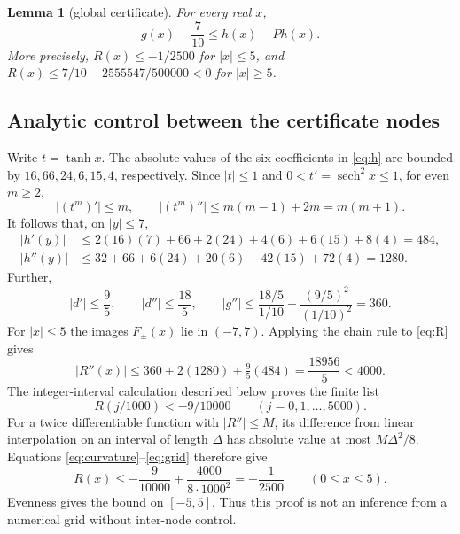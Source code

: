 \documentclass[11pt]{article}
\newtheorem{lemma}[theorem]{Lemma}
\theoremstyle{remark}
\newcommand{\sech}{\operatorname{sech}}
\begin{document}
\begin{lemma}[global certificate]\label{lem:drift}
For every real $x$,
\begin{equation}\label{eq:drift}
g(x)+\frac7{10}\le h(x)-Ph(x).
\end{equation}
More precisely, $R(x)\le-1/2500$ for $|x|\le5$, and
$R(x)\le7/10-2555547/500000<0$ for $|x|\ge5$.
\end{lemma}

\subsection{Analytic control between the certificate nodes}
Write $t=\tanh x$. The absolute values of the six coefficients in \eqref{eq:h} are bounded by $16,66,24,6,15,4$, respectively. Since $|t|\le1$ and $0<t'=\sech^2 x\le1$, for even $m\ge2$,
\[
|(t^m)'|\le m,\qquad
|(t^m)''|\le m(m-1)+2m=m(m+1).
\]
It follows that, on $|y|\le7$,
\begin{align*}
|h'(y)|&\le 2(16)(7)+66+2(24)+4(6)+6(15)+8(4)=484,\\
|h''(y)|&\le 32+66+6(24)+20(6)+42(15)+72(4)=1280.
\end{align*}
Further,
\[
|d'|\le\frac95,\qquad |d''|\le\frac{18}{5},\qquad
|g''|\le \frac{18/5}{1/10}+\frac{(9/5)^2}{(1/10)^2}=360.
\]
For $|x|\le5$ the images $F_\pm(x)$ lie in $(-7,7)$. Applying the chain rule to \eqref{eq:R} gives
\begin{equation}\label{eq:curvature}
|R''(x)|\le360+2(1280)+\tfrac95(484)
=\frac{18956}{5}<4000.
\end{equation}
The integer-interval calculation described below proves the finite list
\begin{equation}\label{eq:grid}
R(j/1000)<-9/10000\qquad(j=0,1,\ldots,5000).
\end{equation}
For a twice differentiable function with $|R''|\le M$, its difference from linear interpolation on an interval of length $\Delta$ has absolute value at most $M\Delta^2/8$. Equations \eqref{eq:curvature}--\eqref{eq:grid} therefore give
\[
R(x)\le-\frac9{10000}+\frac{4000}{8\cdot1000^2}
=-\frac1{2500}\qquad(0\le x\le5).
\]
Evenness gives the bound on $[-5,5]$. Thus this proof is not an inference from a numerical grid without inter-node control.
\end{document}
